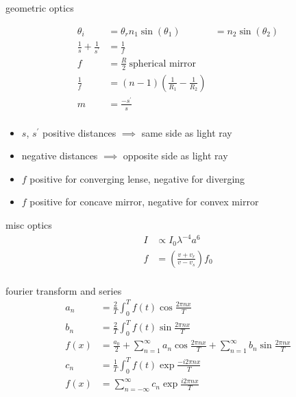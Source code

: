 \documentclass[avery5388, frame, grid]{flashcards}
\begin{document}
\begin{flashcard}{geometric optics}
  {
    \begin{align*}
      \theta_{i} &= \theta_{r}
      n_{1} \sin(\theta_{1}) &= n_{2} \sin(\theta_{2})\\
      \frac{1}{s} + \frac{1}{s^{'}} &= \frac{1}{f}\\
      f &= \frac{R}{2} \ \textrm{spherical mirror}\\
      \frac{1}{f} &= (n - 1) (\frac{1}{R_{1}} - \frac{1}{R_{2}})\\
      m &= \frac{- s^{'}}{s}\\
    \end{align*}
    
    \begin{itemize}
    \item $s$, $s^{'}$ positive distances $\implies$ same side as light ray
    \item negative distances $\implies$ opposite side as light ray
    \item $f$ positive for converging lense, negative for diverging
      \item $f$ positive for concave mirror, negative for convex mirror
    \end{itemize}
  }
\end{flashcard}

\begin{flashcard}{misc optics}
  {
    \begin{align*}
      I &\propto I_{0} \lambda^{-4}a^{6}\\
      f &= (\frac{v + v_{r}}{v - v_{s}}) f_{0}\\
    \end{align*}
  }
\end{flashcard}

\begin{flashcard}{fourier transform and series}
  {
    \begin{align*}
      a_{n} &= \frac{2}{T} \int_{0}^{T} f(t) \cos{\frac{2 \pi n x}{T}}\\
      b_{n} &= \frac{2}{T} \int_{0}^{T} f(t) \sin{\frac{2 \pi n x}{T}}\\
      f(x) &= \frac{a_{0}}{2} + \sum_{n = 1}^{\infty} a_{n} \cos{\frac{2 \pi n x}{T}} + \sum_{n = 1}^{\infty} b_{n} \sin{\frac{2 \pi n x}{T}}\\
      c_{n} &= \frac{1}{T} \int_{0}^{T} f(t) \exp{\frac{-i 2 \pi n x}{T}}\\
      f(x) &= \sum_{n = -\infty}^{\infty} c_{n} \exp{\frac{i 2 \pi n x}{T}}\\
    \end{align*}
  }
\end{flashcard}
\end{document}
